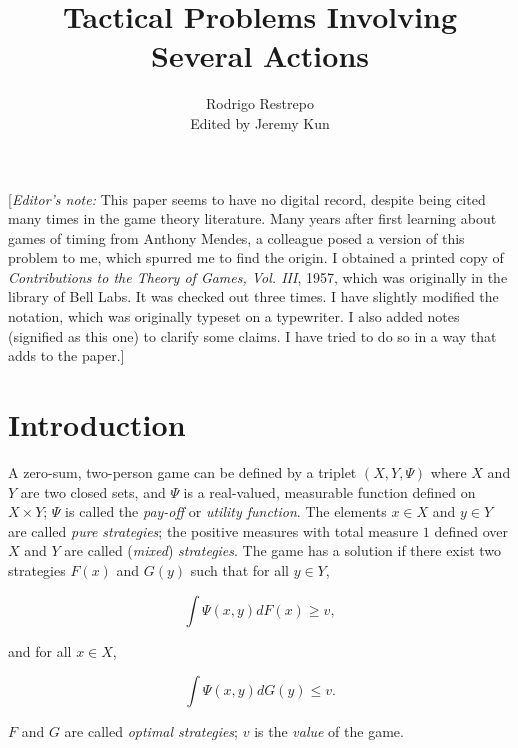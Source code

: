 \documentclass{article}
\title{Tactical Problems Involving Several Actions}
\author{Rodrigo Restrepo \\ Edited by Jeremy Kun}
\begin{document}
\maketitle

[\emph{Editor's note:} This paper seems to have no digital record, despite
being cited many times in the game theory literature. Many years after first
learning about games of timing from Anthony Mendes, a colleague posed a version
of this problem to me, which spurred me to find the origin. I obtained a
printed copy of \emph{Contributions to the Theory of Games, Vol.  III}, 1957,
which was originally in the library of Bell Labs. It was checked out three
times. I have slightly modified the notation, which was originally typeset on a
typewriter. I also added notes (signified as this one) to clarify some claims.
I have tried to do so in a way that adds to the paper.]

\section{Introduction}

A zero-sum, two-person game can be defined by a triplet $(X, Y, \Psi)$ where
$X$ and $Y$ are two closed sets, and $\Psi$ is a real-valued, measurable
function defined on $X \times Y$; $\Psi$ is called the \emph{pay-off} or
\emph{utility function}. The elements $x \in X$ and $y \in Y$ are called
\emph{pure strategies}; the positive measures with total measure $1$ defined
over $X$ and $Y$ are called (\emph{mixed}) \emph{strategies}. The game has a
solution if there exist two strategies $F(x)$ and $G(y)$ such that for all $y
\in Y$,

\[
    \int \Psi(x, y) dF(x) \geq v,
\]

and for all $x \in X$,

\[
    \int \Psi(x, y) dG(y) \leq v.
\]

$F$ and $G$ are called \emph{optimal strategies}; $v$ is the \emph{value} of
the game.
\end{document}
